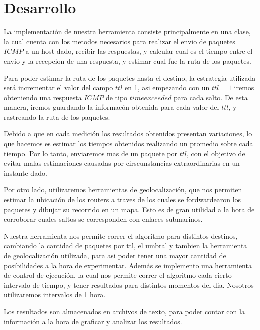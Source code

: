 \section{Desarrollo}


La implementaci\'on de nuestra herramienta consiste principalmente en una clase, la cual cuenta con los metodos necesarios para realizar el envio de paquetes $ICMP$ a un host dado, recibir las respuestas, y calcular cual es el tiempo entre el envio y la recepcion de una respuesta, y estimar cual fue la ruta de los paquetes. 

Para poder estimar la ruta de los paquetes hasta el destino, la estrategia utilizada ser\'a incrementar el valor del campo $ttl$ en 1, asi empezando con un $ttl = 1$ iremos obteniendo una respuesta $ICMP$ de tipo $time exceeded$ para cada salto. De esta manera, iremos guardando la informac\'on obtenida para cada valor del $ttl$, y rastreando la ruta de los paquetes.

Debido a que en cada medici\'on los resultados obtenidos presentan variaciones, lo que hacemos es estimar los tiempos obtenidos realizando un promedio sobre cada tiempo. Por lo tanto, enviaremos mas de un paquete por $ttl$, con el objetivo de evitar malas estimaciones causadas por cirscunstancias extraordinarias en un instante dado.

Por otro lado, utilizaremos herramientas de geolocalizaci\'on, que nos permiten estimar la ubicaci\'on de los routers a traves de los cuales se fordwardearon los paquetes y dibujar su recorrido en un mapa. Esto es de gran utilidad a la hora de corroborar cuales saltos se corresponden con enlaces submarinos.

Nuestra herramienta nos permite correr el algoritmo para distintos destinos, cambiando la cantidad de paquetes por ttl, el umbral y tambien la herramienta de geolocalizaci\'on utilizada, para asi poder tener una mayor cantidad de posibilidades a la hora de experimentar.
Adem\'as se implemento una herramienta de control de ejecuci\'on, la cual nos permite correr el algoritmo cada cierto intervalo de tiempo, y tener resultados para distintos momentos del dia. Nosotros utilizaremos intervalos de 1 hora.


Los resultados son almacenados en archivos de texto, para poder contar con la informaci\'on a la hora de graficar y analizar los resultados.
